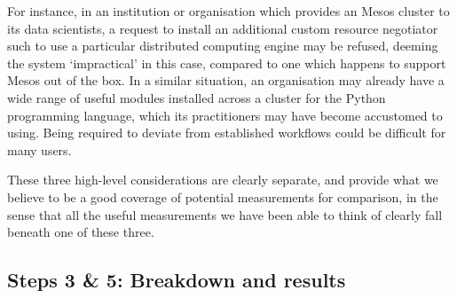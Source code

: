 \begin{description}
      For instance, in an institution or organisation which provides an Mesos cluster to its data scientists, a request to install an additional custom resource negotiator such to use a particular distributed computing engine may be refused, deeming the system `impractical' in this case, compared to one which happens to support Mesos out of the box. In a similar situation, an organisation may already have a wide range of useful modules installed across a cluster for the Python programming language, which its practitioners may have become accustomed to using. Being required to deviate from established workflows could be difficult for many users.
  \end{description}
  
  These three high-level considerations are clearly separate, and provide what we believe to be a good coverage of potential measurements for comparison, in the sense that all the useful measurements we have been able to think of clearly fall beneath one of these three.

  \subsection{Steps 3 \& 5: Breakdown and results}
  \label{BREAKDOWN}

